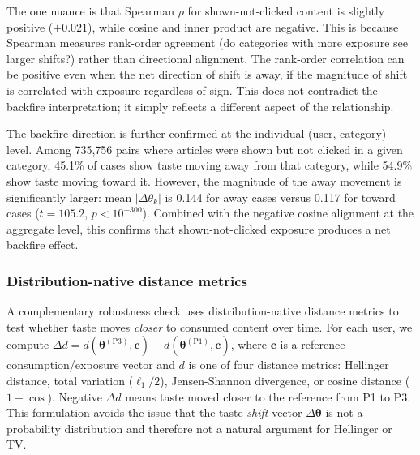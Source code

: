 \documentclass[11pt]{article}
\begin{document}
The one nuance is that Spearman $\rho$ for shown-not-clicked content is slightly positive ($+0.021$), while cosine and inner product are negative. This is because Spearman measures rank-order agreement (do categories with more exposure see larger shifts?) rather than directional alignment. The rank-order correlation can be positive even when the net direction of shift is away, if the magnitude of shift is correlated with exposure regardless of sign. This does not contradict the backfire interpretation; it simply reflects a different aspect of the relationship.

The backfire direction is further confirmed at the individual (user, category) level. Among 735,756 pairs where articles were shown but not clicked in a given category, 45.1\% of cases show taste moving away from that category, while 54.9\% show taste moving toward it. However, the magnitude of the away movement is significantly larger: mean $|\Delta\theta_k|$ is 0.144 for away cases versus 0.117 for toward cases ($t = 105.2$, $p < 10^{-300}$). Combined with the negative cosine alignment at the aggregate level, this confirms that shown-not-clicked exposure produces a net backfire effect.

\subsubsection{Distribution-native distance metrics}
\label{sec:dist_robustness}

A complementary robustness check uses distribution-native distance metrics to test whether taste moves \emph{closer} to consumed content over time. For each user, we compute $\Delta d = d(\boldsymbol{\theta}^{(\text{P3})}, \mathbf{c}) - d(\boldsymbol{\theta}^{(\text{P1})}, \mathbf{c})$, where $\mathbf{c}$ is a reference consumption/exposure vector and $d$ is one of four distance metrics: Hellinger distance, total variation ($\ell_1/2$), Jensen-Shannon divergence, or cosine distance ($1 - \cos$). Negative $\Delta d$ means taste moved closer to the reference from P1 to P3. This formulation avoids the issue that the taste \emph{shift} vector $\Delta\boldsymbol{\theta}$ is not a probability distribution and therefore not a natural argument for Hellinger or TV.
\end{document}
